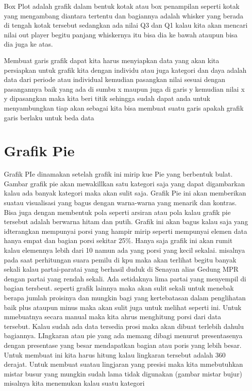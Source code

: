 \documentclass[
]{book}
\theoremstyle{definition}
\theoremstyle{definition}
\theoremstyle{definition}
\theoremstyle{definition}
\theoremstyle{remark}
\begin{document}
Box Plot adalah grafik dalam bentuk kotak atau box penampilan seperti kotak yang mengambang diantara tertentu dan bagiannya adalah whisker yang berada di tengah kotak tersebut sedangkan ada nilai Q3 dan Q1 kalau kita akan mencari nilai out player begitu panjang whiskernya itu bisa dia ke bawah ataupun bisa dia juga ke atas.

Membuat garis grafik dapat kita harus menyiapkan data yang akan kita persiapkan untuk grafik kita dengan individu atau juga kategori dan daya adalah data dari periode atau individual kemudian pasangkan nilai sesuai dengan pasangannya baik yang ada di sumbu x maupun juga di garis y kemudian nilai x y dipasangkan maka kita beri titik sehingga sudah dapat anda untuk menyambungkan tiap akan sebagai kita bisa membuat suatu garis apakah grafik garis berlaku untuk beda data

\hypertarget{grafik-pie}{%
\section{Grafik Pie}\label{grafik-pie}}

Grafik PIe dinamakan setelah grafik ini mirip kue Pie yang berbentuk bulat. Gambar grafik pie akan mewakillkan satu kategori saja yang dapat digambarkan kalau ada banyak kategori maka akan sulit saja.
Grafik Pie ini akan memberikan suatau visualisasi yang bagus dengan warna-warna yang menarik dan kontras. Bisa juga dengan membentuk pola seperti arsiran atau pola kalau grafik pie tersebut adalah berwarna hitam dan putih.
Grafik ini akan bagus kalau saja yang idterangkan mempunyai porsi yang hampir mirip seperti mempunyai elemen data hanya empat dan bagian porsi sekitar 25\%. Hanya saja grafik ini akan rumit kalau elemennya lebih dari 10 namun ada yang porsi yang kecil sekalai. misalnya pada saat perhitungan suara pemilu di kpu maka akan terlihat begitu banyak sekali kalau partai-paratai yang berhasil duduk di Senayan alias Gedung MPR dengan partai yang rendah sekali. Ada setidaknya lima partai yang menyempil di bagian tersbeut. seperti grafik lainnya maka akan sulit sekali untuk menebak berapa jumlah proisinya dan mungkin bagi yang kertebatasan dalam penglihatan baik plus ataupun minus maka akan sulit juga untuk melihat seperti ini.
Untuk mmebuatnya secara manual maka kita ahrus menghitung porsi dari data tersebut. Kalau sudah ada data tersedia prosi maka akan dibuat terlebih dahulu bagiannya. LIngkaran atau pie yang ada memang dibagi menurut presentasenya dengan presentase yang besar mendapatkan bagian atau poris yang lebih besar.
Untuk membuat ini kita harus hitung kalau lingkaran tersebut adalah 360 derajat. Untuk membuat suatau lingjaran yang presisi maka kita mmebutuhkan mistar busur yang mungkin sudah lama tidak digunakan (gambar mistar bujur)
misalnya kita menemukan kalau suatu kategori
\end{document}
